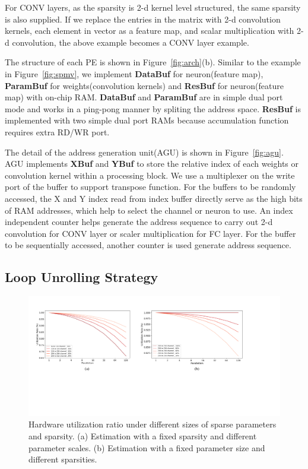 For CONV layers, as the sparsity is 2-d kernel level structured, the same sparsity is also supplied. If we replace the entries in the matrix with 2-d convolution kernels, each element in vector as a feature map, and scalar multiplication with 2-d convolution, the above example becomes a CONV layer example.

The structure of each PE is shown in Figure~\ref{fig:arch}(b). Similar to the example in Figure~\ref{fig:spmv}, we implement {\bf{DataBuf}} for neuron(feature map), {\bf{ParamBuf}} for weights(convolution kernels) and {\bf{ResBuf}} for neuron(feature map) with on-chip RAM. {\bf{DataBuf}} and {\bf{ParamBuf}} are in simple dual port mode and works in a ping-pong manner by spliting the address space. {\bf{ResBuf}} is implemented with two simple dual port RAMs because accumulation function requires extra RD/WR port.

The detail of the address generation unit(AGU) is shown in Figure~\ref{fig:agu}. AGU implements {\bf{XBuf}} and {\bf{YBuf}} to store the relative index of each weights or convolution kernel within a processing block. We use a multiplexer on the write port of the buffer to support transpose function. For the buffers to be randomly accessed, the X and Y index read from index buffer directly serve as the high bits of RAM addresses, which help to select the channel or neuron to use. An index independent counter helps generate the address sequence to carry out 2-d convolution for CONV layer or scaler multiplication for FC layer. For the buffer to be sequentially accessed, another counter is used generate address sequence.

\subsection{Loop Unrolling Strategy}\label{sec:hw_unroll}
\begin{figure}[t]
  \centering
  \includegraphics[width=2.0\columnwidth]{figures/util_sim.pdf}
  \caption{Hardware utilization ratio under different sizes of sparse parameters and sparsity. (a) Estimation with a fixed sparsity and different parameter scales. (b) Estimation with a fixed parameter size and different sparsities.}
  \label{fig:util_sim}
\end{figure}

